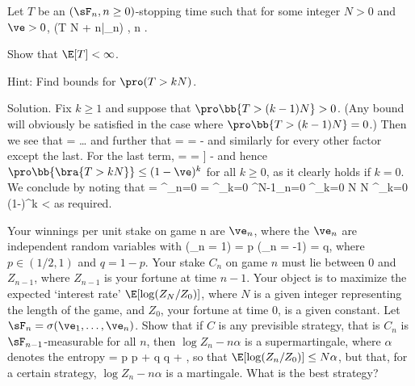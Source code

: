 \vspace{2mm}

\qcutline


\item Let $T$ be an $(\sF_n, n \geq  0)$-stopping time such that for some integer $N > 0$ and $\ve > 0$,
\be
\pro(T \leq N + n|\sF_n) \geq \ve, n .
\ee

Show that $\E[T] < \infty$.

Hint: Find bounds for $\pro(T > kN)$.

\scutline

Solution. Fix $k \geq 1$ and suppose that $\pro\bb{T > (k-1)N} > 0$. (Any bound will obviously be satisfied in the case where $\pro\bb{T > (k-1)N} = 0$.) Then we see that
\be
\pro{} = \pro{}\dots \pro{} \pro{}
\ee
and further that
\be
\pro{} =  =  -\ve
\ee
and similarly for every other factor except the last. For the last term,
\be
\pro{} =  = \E[\E[\ind_{\bra{T>N}}|\sF_0]] -\ve
\ee
and hence $\pro\bb{\bra{T > kN}} \leq  (1-\ve)^k$ for all $k \geq 0$, as it clearly holds if $k = 0$. We conclude by noting that
\be
\E[T] = \sum^\infty_{n=0} \pro{} = \sum^\infty_{k=0} \sum^{N-1}_{n=0} \pro{} \leq \sum^\infty_{k=0} N\pro{} \leq  N \sum^\infty_{k=0} (1-\ve)^k < \infty
\ee
as required.

\vspace{2mm}

\qcutline


\item Your winnings per unit stake on game n are $\ve_n$, where the $\ve_n$ are independent random variables with
\be
\pro(\ve_n = 1) = p \quad {} \quad \pro(\ve_n = -1) = q,
\ee
where $p \in (1/2, 1)$ and $q = 1 - p$. Your stake $C_n$ on game $n$ must lie between 0 and $Z_{n-1}$, where $Z_{n-1}$ is your fortune at time $n - 1$. Your object is to maximize the expected `interest rate' $\E[\log(Z_N/Z_0)]$, where $N$ is a given integer representing the length of the game, and $Z_0$, your fortune at time 0, is a given constant. Let $\sF_n = \sigma(\ve_1, \dots, \ve_n)$. Show that if $C$ is any previsible strategy, that is $C_n$ is $\sF_{n-1}$-measurable for all $n$, then $\log Z_n - n\alpha$ is a supermartingale, where $\alpha$ denotes the entropy
\be
\alpha = p \log p + q \log q + ,
\ee
so that $\E[\log(Z_n/Z_0)] \leq N\alpha$, but that, for a certain strategy, $\log Z_n - n\alpha$ is a martingale. What is the best strategy?

